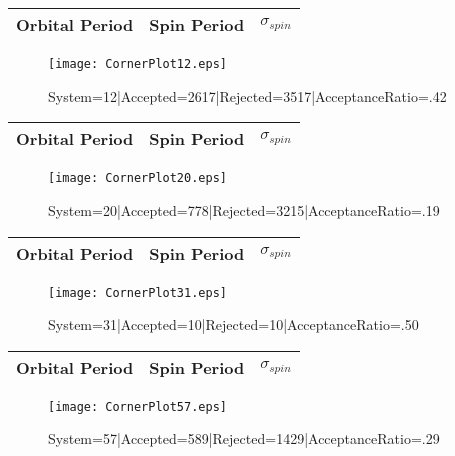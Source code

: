 \documentclass[10pt]{article}
\begin{document}
\begin{center}
        \begin{tabular}{|c|c|c|}
        \hline
Orbital Period & Spin Period & $\sigma_{spin}$ \\
 \hline
        \end{tabular}
        \end{center}
\begin{figure}[h] 
        \texttt{[image: CornerPlot12.eps]}
        \caption{System=12|Accepted=2617|Rejected=3517|AcceptanceRatio=.42}
        \label{S12}
        \centering
        \end{figure}
\begin{center}
        \begin{tabular}{|c|c|c|}
        \hline
Orbital Period & Spin Period & $\sigma_{spin}$ \\
 \hline
        \end{tabular}
        \end{center}
\begin{figure}[h] 
        \texttt{[image: CornerPlot20.eps]}
        \caption{System=20|Accepted=778|Rejected=3215|AcceptanceRatio=.19}
        \label{S20}
        \centering
        \end{figure}
\begin{center}
        \begin{tabular}{|c|c|c|}
        \hline
Orbital Period & Spin Period & $\sigma_{spin}$ \\
 \hline
        \end{tabular}
        \end{center}
\begin{figure}[h] 
        \texttt{[image: CornerPlot31.eps]}
        \caption{System=31|Accepted=10|Rejected=10|AcceptanceRatio=.50}
        \label{S31}
        \centering
        \end{figure}
\begin{center}
        \begin{tabular}{|c|c|c|}
        \hline
Orbital Period & Spin Period & $\sigma_{spin}$ \\
 \hline
        \end{tabular}
        \end{center}
\begin{figure}[h] 
        \texttt{[image: CornerPlot57.eps]}
        \caption{System=57|Accepted=589|Rejected=1429|AcceptanceRatio=.29}
        \label{S57}
        \centering
        \end{figure}
\end{document}
